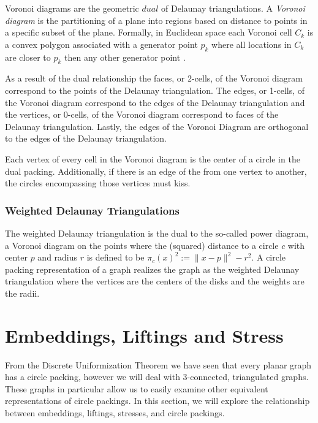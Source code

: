 \documentclass[11pt]{article}
\theoremstyle{definition}
\begin{document}
	Voronoi diagrams are the geometric $dual$ of Delaunay triangulations. 
	A \emph{Voronoi diagram} is the partitioning of a plane into regions based on distance to points in a specific subset of the plane. 
	Formally, in Euclidean space each Voronoi cell $C_k$ is a convex polygon associated with a generator point $p_k$ where all locations in $C_k$ are closer to $p_k$ then any other generator point \cite{voronoiDiagrams}. 

	As a result of the dual relationship the faces, or 2-cells, of the Voronoi diagram correspond to the points of the Delaunay triangulation. 
	The edges, or 1-cells, of the Voronoi diagram correspond to the edges of the Delaunay triangulation and the vertices, or 0-cells, of the Voronoi diagram correspond to faces of the Delaunay triangulation.
	Lastly, the edges of the Voronoi Diagram are orthogonal to the edges of the Delaunay triangulation. 

	Each vertex of every cell in the Voronoi diagram is the center of a circle in the dual packing. 
	Additionally, if there is an edge of the from one vertex to another, the circles encompassing those vertices must kiss. 

\subsubsection{Weighted Delaunay Triangulations}
	The weighted Delaunay triangulation is the dual to the so-called power diagram, a Voronoi diagram on the points where the (squared) distance to a circle $c$ with center $p$ and radius $r$ is defined to be $\pi_c(x)^2 := \|x-p\|^2 - r^2$.
  	A circle packing representation of a graph realizes the graph as the weighted Delaunay triangulation where the vertices are the centers of the disks and the weights are the radii.
  
\section{Embeddings, Liftings and Stress}
	
	From the Discrete Uniformization Theorem we have seen that every planar graph has a circle packing, however we will deal with 3-connected, triangulated graphs. 
	These graphs in particular allow us to easily examine other equivalent representations of circle packings. 
	In this section, we will explore the relationship between embeddings, liftings, stresses, and circle packings.
\end{document}
